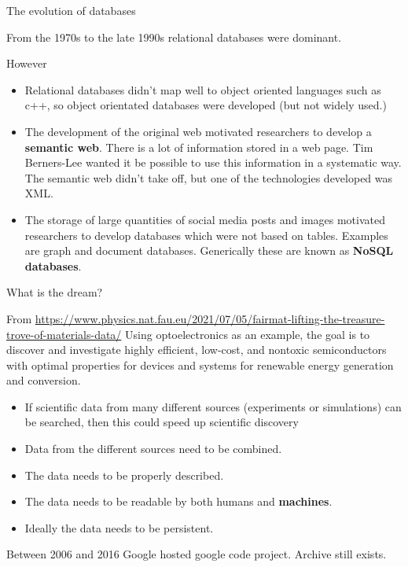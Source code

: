 \documentclass[aspectratio=169,xcolor=dvipsnames]{beamer}
\begin{document}

\begin{frame}{The evolution of databases}

From the 1970s to the late 1990s relational databases were dominant. 

\vspace{1cm}
However
\begin{itemize}
    \item Relational databases didn't map well to object oriented languages such as c++, so object orientated databases were developed (but not widely used.)
\item The development of the original web motivated researchers to develop a \textbf{semantic web}. There is a lot of information stored in a web page.  Tim Berners-Lee wanted it be possible to use this information in a systematic way. The semantic web didn't take off, but one of the technologies developed was XML.

\item The storage of large quantities of social media posts and images motivated researchers to develop databases which were not based on tables.
Examples are graph and document databases. Generically these are known as \textbf{NoSQL databases}.

    
\end{itemize}

\end{frame}

\begin{frame}{What is the dream?} 

From \url{https://www.physics.nat.fau.eu/2021/07/05/fairmat-lifting-the-treasure-trove-of-materials-data/}
Using optoelectronics as an example, the goal is to discover and investigate highly efficient, low-cost, and nontoxic semiconductors with optimal properties for devices and systems for renewable energy generation and conversion.

\vspace{0.5 cm}

\begin{itemize}

\item If scientific data from many different sources (experiments or simulations)  can be searched, then this could speed up scientific discovery


\item Data from the different sources need to be combined.

\item The data needs to be properly described.

\item The data needs to be readable by both humans and \textbf{machines}.

\item Ideally the data needs to be persistent. 
\end{itemize}

Between 2006 and 2016 Google hosted google code project. Archive still exists.

\end{frame}
\end{document}
